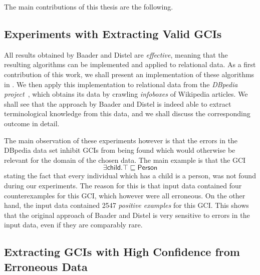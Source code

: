 The main contributions of this thesis are the following.

\subsection{Experiments with Extracting Valid GCIs}
\label{sec:exper-with-extr}

All results obtained by Baader and Distel are \emph{effective}, meaning that the resulting
algorithms can be implemented and applied to relational data.  As a first contribution of
this work, we shall present an implementation of these algorithms in
.  We then apply this implementation to relational data
from the \emph{DBpedia project}~\cite{DBpedia}, which obtains its data by crawling
\emph{infoboxes} of Wikipedia articles.  We shall see that the approach by Baader and
Distel is indeed able to extract terminological knowledge from this data, and we shall
discuss the corresponding outcome in detail.

The main observation of these experiments however is that the errors in the DBpedia data
set inhibit GCIs from being found which would otherwise be relevant for the domain of the
chosen data.  The main example is that the GCI
\begin{equation*}
  \exists \mathsf{child}. \top \sqsubseteq \mathsf{Person}
\end{equation*}
stating the fact that every individual which has a child is a person, was not found during
our experiments.  The reason for this is that input data contained four counterexamples
for this GCI, which however were all erroneous.  On the other hand, the input data
contained 2547 \emph{positive examples} for this GCI.  This shows that the original
approach of Baader and Distel is very sensitive to errors in the input data, even if they
are comparably rare.

\subsection{Extracting GCIs with High Confidence from Erroneous Data}
\label{sec:extracting-gcis-from}

